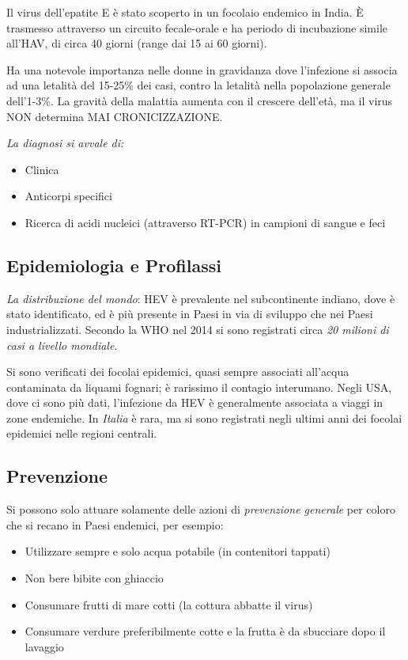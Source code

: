 Il virus dell'epatite E è stato scoperto in un focolaio endemico in
India. È trasmesso attraverso un circuito fecale-orale e ha periodo di
incubazione simile all'HAV, di circa 40 giorni (range dai 15 ai 60
giorni).

Ha una notevole importanza nelle donne in gravidanza dove l'infezione si
associa ad una letalità del 15-25\% dei casi, contro la letalità nella
popolazione generale dell'1-3\%. La gravità della malattia aumenta con
il crescere dell'età, ma il virus NON determina MAI CRONICIZZAZIONE.

\emph{La diagnosi si avvale di:}

\begin{itemize}
\item
  Clinica
\item
  Anticorpi specifici
\item
  Ricerca di acidi nucleici (attraverso RT-PCR) in campioni di sangue e
  feci
\end{itemize}

\subsection{Epidemiologia e Profilassi}


\emph{La distribuzione del mondo}: HEV è prevalente nel subcontinente
indiano, dove è stato identificato, ed è più presente in Paesi in via di
sviluppo che nei Paesi industrializzati. Secondo la WHO nel 2014 si sono
registrati circa \emph{20 milioni di casi a livello mondiale.}

Si sono verificati dei focolai epidemici, quasi sempre associati
all'acqua contaminata da liquami fognari; è rarissimo il contagio
interumano. Negli USA, dove ci sono più dati, l'infezione da HEV è
generalmente associata a viaggi in zone endemiche. In \emph{Italia} è
rara, ma si sono registrati negli ultimi anni dei focolai epidemici
nelle regioni centrali.
\subsection{Prevenzione}


Si possono solo attuare solamente delle azioni di \emph{prevenzione
generale} per coloro che si recano in Paesi endemici, per esempio:

\begin{itemize}
\item
  Utilizzare sempre e solo acqua potabile (in contenitori tappati)
\item
  Non bere bibite con ghiaccio
\item
  Consumare frutti di mare cotti (la cottura abbatte il virus)
\item
  Consumare verdure preferibilmente cotte e la frutta è da sbucciare
  dopo il lavaggio
\end{itemize}


